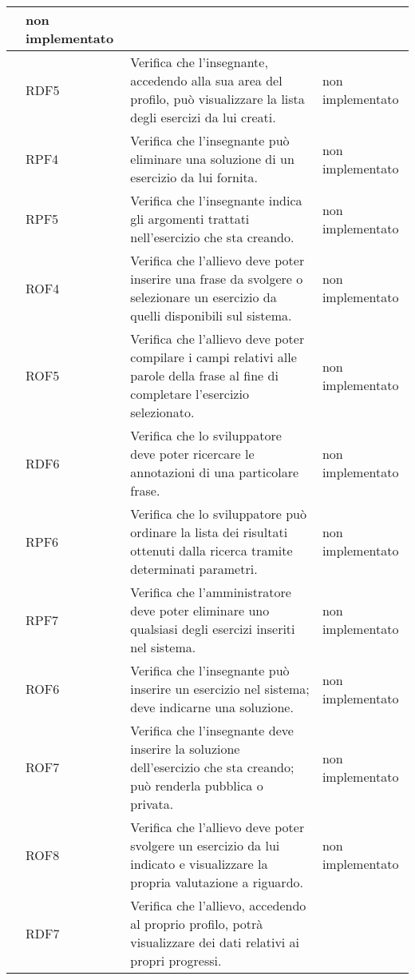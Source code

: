 \begin{longtable}{|p{2cm}|p{2cm}|p{6.25cm}|p{4cm}|}
		& non implementato\\ \hline
		\rowcolor{LightGray}
		& RDF5 
		& Verifica che l'insegnante, accedendo alla sua area del profilo, può visualizzare la lista degli esercizi da lui creati. 
		& non implementato\\ \hline
		\rowcolor{LightGray}
		& RPF4 
		& Verifica che l'insegnante può eliminare una soluzione di un esercizio da lui fornita. 
		& non implementato\\ \hline
		\rowcolor{LightGray}
		& RPF5 
		& Verifica che l'insegnante indica gli argomenti trattati nell'esercizio che sta creando. 
		& non implementato\\ \hline
		\rowcolor{LightGray}
		& ROF4 
		& Verifica che l'allievo deve poter inserire una frase da svolgere o selezionare un esercizio da quelli disponibili sul sistema. 
		& non implementato\\ \hline
		\rowcolor{LightGray}
		& ROF5 
		& Verifica che l'allievo deve poter compilare i campi relativi alle parole della frase al fine di completare l'esercizio selezionato. 
		& non implementato\\ \hline
		\rowcolor{LightGray}
		& RDF6 
		& Verifica che lo sviluppatore deve poter ricercare le annotazioni di una particolare frase. 
		& non implementato\\ \hline
		\rowcolor{LightGray}
		& RPF6 
		& Verifica che lo sviluppatore può ordinare la lista dei risultati ottenuti dalla ricerca tramite determinati parametri. 
		& non implementato\\ \hline
		\rowcolor{LightGray}
		& RPF7 
		& Verifica che l'amministratore deve poter eliminare uno qualsiasi degli esercizi inseriti nel sistema. 
		& non implementato\\ \hline
		\rowcolor{LightGray}
		& ROF6 
		& Verifica che l'insegnante può inserire un esercizio nel sistema; deve indicarne una soluzione. 
		& non implementato\\ \hline
		\rowcolor{LightGray}
		& ROF7 
		& Verifica che l'insegnante deve inserire la soluzione dell'esercizio che sta creando; può renderla pubblica o privata. 
		& non implementato\\ \hline
		\rowcolor{LightGray}
		& ROF8 
		& Verifica che l'allievo deve poter svolgere un esercizio da lui indicato e visualizzare la propria valutazione a riguardo. 
		& non implementato\\ \hline
		\rowcolor{LightGray}
		& RDF7 
		& Verifica che l'allievo, accedendo al proprio profilo, potrà visualizzare dei dati relativi ai propri progressi. 

\end{longtable}
